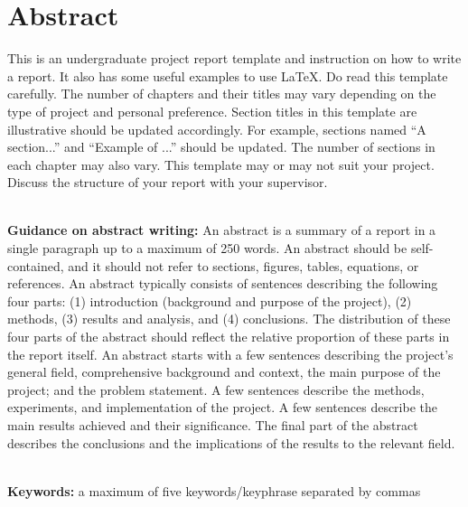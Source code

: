 \chapter*{\center \Large  Abstract}

This is an undergraduate project report template and instruction on how to write a report. It also has some useful examples to use \LaTeX. Do read this template carefully. The number of chapters and their titles may vary depending on the type of project and personal preference. Section titles in this template are illustrative should be updated accordingly. For example, sections named ``A section...'' and ``Example of ...'' should be updated. The number of sections in each chapter may also vary. This template may or may not suit your project. Discuss the structure of your report with your supervisor.

~\\[1cm]%
\noindent\textbf{Guidance on abstract writing:} An abstract is a summary of a report in a single paragraph up to a maximum of 250 words. An abstract should be self-contained, and it should not refer to sections, figures, tables, equations, or references. An abstract typically consists of sentences describing the following four parts: (1) introduction (background and purpose of the project), (2) methods, (3) results and analysis, and (4) conclusions. The distribution of these four parts of the abstract should reflect the relative proportion of these parts in the report itself. An abstract starts with a few sentences describing the project's general field, comprehensive background and context, the main purpose of the project; and the problem statement. A few sentences describe the methods, experiments, and implementation of the project. A few sentences describe the main results achieved and their significance. The final part of the abstract describes the conclusions and the implications of the results to the relevant field.


~\\[1cm]
\noindent %
\textbf{Keywords:} a maximum of five keywords/keyphrase separated by commas

